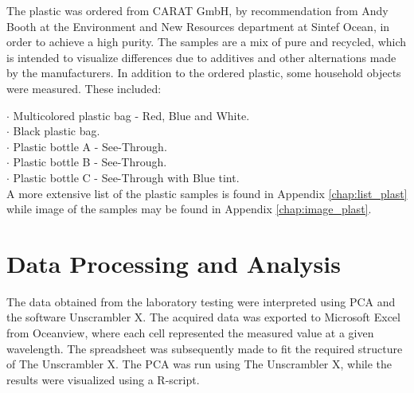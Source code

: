 The plastic was ordered from CARAT GmbH, by recommendation from Andy Booth at the Environment and New Resources department at Sintef Ocean, in order to achieve a high purity. The samples are a mix of pure and recycled, which is intended to visualize differences due to additives and other alternations made by the manufacturers. In addition to the ordered plastic, some household objects were measured. These included:

$\cdot$ Multicolored plastic bag - Red, Blue and White.\\
$\cdot$ Black plastic bag.\\
$\cdot$ Plastic bottle A - See-Through.\\
$\cdot$ Plastic bottle B - See-Through.\\
$\cdot$ Plastic bottle C - See-Through with Blue tint.
\\
A more extensive list of the plastic samples is found in Appendix \autoref{chap:list_plast} while image of the samples may be found in Appendix \autoref{chap:image_plast}.
\section{Data Processing and Analysis}
The data obtained from the laboratory testing were interpreted using PCA and the software Unscrambler X. The acquired data was exported to Microsoft Excel from Oceanview, where each cell represented the measured value at a given wavelength. The spreadsheet was subsequently made to fit the required structure of The Unscrambler X. The PCA was run using The Unscrambler X, while the results were visualized using a R-script.


